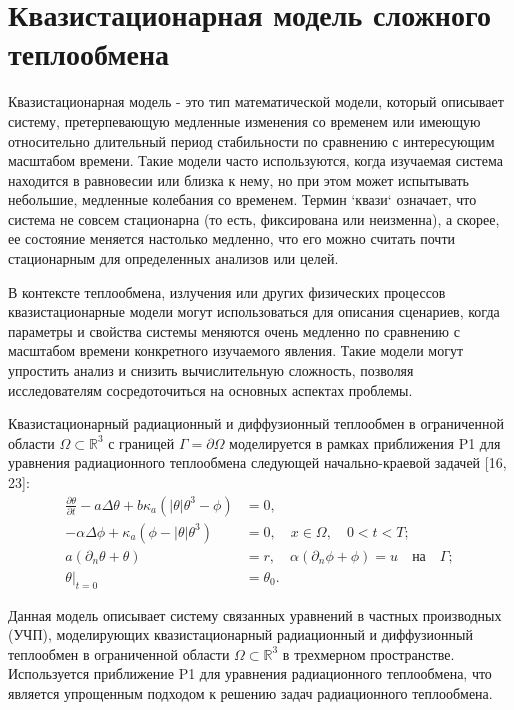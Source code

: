 \section{Квазистационарная модель сложного теплообмена}
\label{sec:ch1/sec4}
Квазистационарная модель - это тип математической модели,
который описывает систему, претерпевающую медленные изменения
со временем или имеющую относительно длительный период стабильности
по сравнению с интересующим масштабом времени.
Такие модели часто используются, когда изучаемая система находится
в равновесии или близка к нему, но при этом может испытывать небольшие,
медленные колебания со временем.
Термин `квази` означает,
что система не совсем стационарна (то есть, фиксирована или неизменна),
а скорее, ее состояние меняется настолько медленно, что его можно считать
почти стационарным для определенных анализов или целей.

В контексте теплообмена, излучения или других физических процессов
квазистационарные модели могут использоваться для описания сценариев,
когда параметры и свойства системы меняются очень медленно по сравнению
с масштабом времени конкретного изучаемого явления.
Такие модели могут упростить анализ и снизить вычислительную сложность,
позволяя исследователям сосредоточиться на основных аспектах проблемы.


Квазистационарный радиационный и диффузионный теплообмен в ограниченной
области $\Omega \subset \mathbb{R}^3$ с границей
$\Gamma = \partial\Omega$ моделируется в рамках приближения P1
для уравнения радиационного теплообмена следующей
начально-краевой задачей [16, 23]:
\begin{align*}
    \frac{\partial\theta}{\partial t} - a\Delta\theta
    + b\kappa_a (|\theta|\theta^3 - \phi) &= 0, \\
    - \alpha\Delta\phi + \kappa_a (\phi - |\theta|\theta^3 ) &= 0,
    \quad x \in \Omega, \quad 0 < t < T ; \tag{1} \\
    a(\partial_n \theta + \theta) &= r,
    \quad \alpha(\partial_n \phi + \phi) = u
    \quad \text{на} \quad \Gamma ; \tag{2} \\
    \theta|_{t=0} &= \theta_0. \tag{3}
\end{align*}

Данная модель описывает систему связанных уравнений в частных производных (УЧП),
моделирующих квазистационарный радиационный и диффузионный теплообмен в
ограниченной области $\Omega \subset \mathbb{R}^3$ в трехмерном пространстве.
Используется приближение P1 для уравнения радиационного теплообмена,
что является упрощенным подходом к решению задач радиационного теплообмена.

